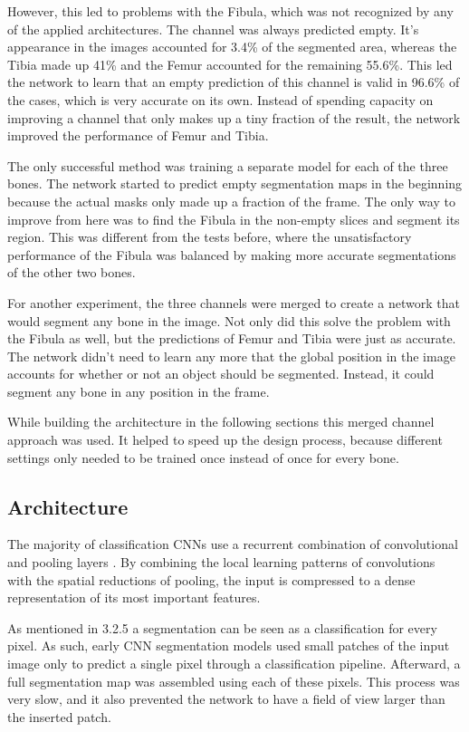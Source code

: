 However, this led to problems with the Fibula, which was not recognized by any of the applied architectures. The channel was always predicted empty. It's appearance in the images accounted for 3.4\% of the segmented area, whereas the Tibia made up 41\% and the Femur accounted for the remaining 55.6\%. This led the network to learn that an empty prediction of this channel is valid in 96.6\% of the cases, which is very accurate on its own. Instead of spending capacity on improving a channel that only makes up a tiny fraction of the result, the network improved the performance of Femur and Tibia.

The only successful method was training a separate model for each of the three bones. The network started to predict empty segmentation maps in the beginning because the actual masks only made up a fraction of the frame. The only way to improve from here was to find the Fibula in the non-empty slices and segment its region. This was different from the tests before, where the unsatisfactory performance of the Fibula was balanced by making more accurate segmentations of the other two bones.

For another experiment, the three channels were merged to create a network that would segment any bone in the image. Not only did this solve the problem with the Fibula as well, but the predictions of Femur and Tibia were just as accurate. The network didn't need to learn any more that the global position in the image accounts for whether or not an object should be segmented. Instead, it could segment any bone in any position in the frame.

While building the architecture in the following sections this merged channel approach was used. It helped to speed up the design process, because different settings only needed to be trained once instead of once for every bone.

\subsection{Architecture}

The majority of classification CNNs use a recurrent combination of convolutional and pooling layers \cite{Krizhevsky}\cite{He2015b}\cite{Iandola2016a}\cite{Ronneberger2015a}. By combining the local learning patterns of convolutions with the spatial reductions of pooling, the input is compressed to a dense representation of its most important features.

As mentioned in 3.2.5 a segmentation can be seen as a classification for every pixel. As such, early CNN segmentation models used small patches of the input image only to predict a single pixel through a classification pipeline. Afterward, a full segmentation map was assembled using each of these pixels. This process was very slow, and it also prevented the network to have a field of view larger than the inserted patch.

